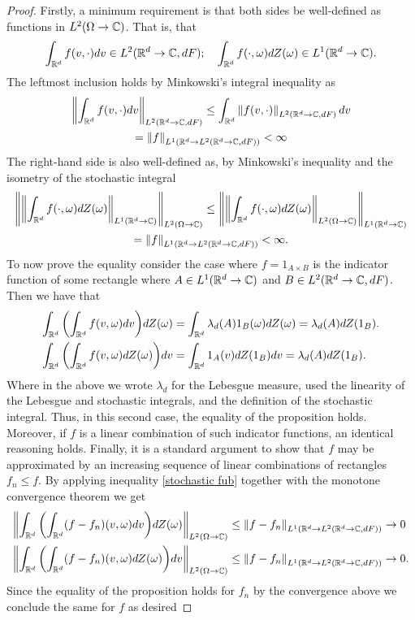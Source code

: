 \documentclass[
    a4paper,
    DIV=14,
    abstract=true,
    numbers=noenddot
]{scrartcl}
\begin{document}
\begin{proof}
	Firstly, a minimum requirement is that both sides be well-defined as functions in $L^2(\Omega\to\mathbb{C})$. That is, that
	\begin{equation*}
		\int_{\mathbb{R}^d}f(v,\cdot)dv\in L^2(\mathbb{R}^d\to\mathbb{C},dF);\quad   \int_{\mathbb{R}^d}f(\cdot,\omega)dZ(\omega)\in L^1(\mathbb{R}^d\to\mathbb{C}).
	\end{equation*}
	The leftmost inclusion holds by Minkowski's integral inequality as
	\begin{multline*}
		\left\lVert \int_{\mathbb{R}^d}f(v,\cdot)dv \right\rVert_{L^2(\mathbb{R}^d\to\mathbb{C},dF)}\leq\int_{\mathbb{R}^d}\left\lVert f(v,\cdot) \right\rVert_{L^2(\mathbb{R}^d\to\mathbb{C},dF)}dv\\=\left\lVert f \right\rVert_{L^1(\mathbb{R}^d\to L^2(\mathbb{R}^d\to\mathbb{C},dF))}<\infty
	\end{multline*}
	The right-hand side is also well-defined as, by Minkowski's inequality and the isometry of the stochastic integral
	\begin{multline}\label{stochastic fub}
		\left\lVert \left\lVert \int_{\mathbb{R}^d}f(\cdot,\omega)dZ(\omega) \right\rVert_{L^1(\mathbb{R}^d\to\mathbb{C})} \right\rVert_{L^2(\Omega\to\mathbb{C})}\leq \left\lVert \left\lVert \int_{\mathbb{R}^d}f(\cdot,\omega)dZ(\omega) \right\rVert_{L^2(\Omega\to\mathbb{C})} \right\rVert_{L^1(\mathbb{R}^d\to\mathbb{C})}\\=\left\lVert f \right\rVert_{L^1(\mathbb{R}^d\to L^2(\mathbb{R}^d\to\mathbb{C},dF))}<\infty.
	\end{multline}
	To now prove the equality consider the case where $f=1_{A\times B}$ is the indicator function of some rectangle where $A\in L^1(\mathbb{R}^d\to\mathbb{C})$ and $B\in L^2(\mathbb{R}^d\to\mathbb{C},dF)$. Then we have that
	\begin{align*}
		\int_{\mathbb{R}^d}\qty(\int_{\mathbb{R}^d}f(v,\omega)dv)dZ(\omega) & =\int_{\mathbb{R}^d}\lambda_d(A)1_B(\omega) dZ(\omega)=\lambda_d(A)dZ(1_B). \\
		\int_{\mathbb{R}^d}\qty(\int_{\mathbb{R}^d}f(v,\omega)dZ(\omega))dv & = \int_{\mathbb{R}^d}1_A(v)dZ(1_B)dv=\lambda_d(A)dZ(1_B).
	\end{align*}
	Where in the above we wrote $\lambda_d$ for the Lebesgue measure, used the linearity of the Lebesgue and stochastic integrals, and the definition of the stochastic integral. Thus, in this second case, the equality of the proposition holds. Moreover, if $f$ is a linear combination of such indicator functions, an identical reasoning holds. Finally, it is a standard argument to show that $f$ may be approximated by an increasing sequence of linear combinations of rectangles  $f_n\leq f$. By applying inequality \eqref{stochastic fub} together with the monotone convergence theorem we get
	\begin{align*}
		\left\lVert \int_{\mathbb{R}^d}\qty(\int_{\mathbb{R}^d}(f-f_n)(v,\omega)dv)dZ(\omega) \right\rVert_{L^2(\Omega\to\mathbb{C})} & \leq\left\lVert f-f_n \right\rVert_{L^1(\mathbb{R}^d\to L^2(\mathbb{R}^d\to\mathbb{C},dF))}\to 0 \\\left\lVert \int_{\mathbb{R}^d}\qty(\int_{\mathbb{R}^d}(f-f_n)(v,\omega)dZ(\omega))dv \right\rVert_{L^2(\Omega\to\mathbb{C})}&\leq\left\lVert f-f_n \right\rVert_{L^1(\mathbb{R}^d\to L^2(\mathbb{R}^d\to\mathbb{C},dF))}\to 0.
	\end{align*}
	Since the equality of the proposition holds for $f_n$ by the convergence above we conclude the same for  $f$ as desired
\end{proof}
\end{document}

